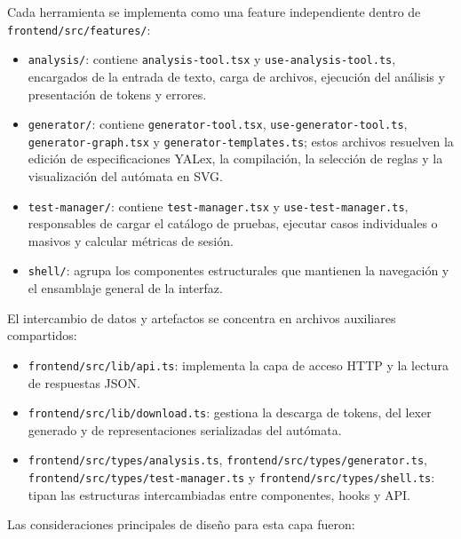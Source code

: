 \documentclass[12pt,a4paper]{article}
\begin{document}
Cada herramienta se implementa como una feature independiente dentro de \texttt{frontend/src/features/}:

\begin{itemize}[leftmargin=2em]
  \item \texttt{analysis/}: contiene \texttt{analysis-tool.tsx} y \texttt{use-analysis-tool.ts}, encargados de la entrada de texto, carga de archivos, ejecución del análisis y presentación de tokens y errores.
  \item \texttt{generator/}: contiene \texttt{generator-tool.tsx}, \texttt{use-generator-tool.ts}, \texttt{generator-graph.tsx} y \texttt{generator-templates.ts}; estos archivos resuelven la edición de especificaciones YALex, la compilación, la selección de reglas y la visualización del autómata en SVG.
  \item \texttt{test-manager/}: contiene \texttt{test-manager.tsx} y \texttt{use-test-manager.ts}, responsables de cargar el catálogo de pruebas, ejecutar casos individuales o masivos y calcular métricas de sesión.
  \item \texttt{shell/}: agrupa los componentes estructurales que mantienen la navegación y el ensamblaje general de la interfaz.
\end{itemize}

El intercambio de datos y artefactos se concentra en archivos auxiliares compartidos:

\begin{itemize}[leftmargin=2em]
  \item \texttt{frontend/src/lib/api.ts}: implementa la capa de acceso HTTP y la lectura de respuestas JSON.
  \item \texttt{frontend/src/lib/download.ts}: gestiona la descarga de tokens, del lexer generado y de representaciones serializadas del autómata.
  \item \texttt{frontend/src/types/analysis.ts}, \texttt{frontend/src/types/generator.ts}, \texttt{frontend/src/types/test-manager.ts} y \texttt{frontend/src/types/shell.ts}: tipan las estructuras intercambiadas entre componentes, hooks y API.
\end{itemize}

Las consideraciones principales de diseño para esta capa fueron:
\end{document}
